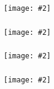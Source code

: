 \documentclass{beamer}
\newcommand{\plotslide}[2]{
  \begin{frame}
    \frametitle{#1}
    \texttt{[image: \#2]}
  \end{frame}
}
\begin{document}
\plotslide{}{StotVsMAPKpp.pdf}

\plotslide{}{SmemVsp3.pdf}

\plotslide{}{ScaffoldVsMAPKppMI.pdf}

\plotslide{}{GradientVsMI.pdf}
\end{document}
